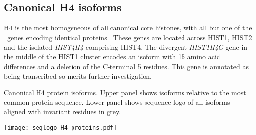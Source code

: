  \subsection{Canonical H4 isoforms}
    H4 is the most homogeneous of all canonical core histones,
    with all but one of the \HFourCodingGenes{}~genes encoding
    identical proteins .
    These genes are located across HIST1, HIST2 and the isolated
    \textit{HIST4H4} comprising HIST4.
    The divergent \textit{HIST1H4G} gene in the middle of the HIST1 cluster
    encodes an isoform with 15 amino acid differences and a deletion of the C-terminal 5 residues.
    This gene is annotated as being transcribed so merits further investigation.

    \begin{table}
      \caption{
        Canonical H4 protein isoforms.  Upper panel shows isoforms
        relative to the most common protein sequence.  Lower panel
        shows sequence logo of all isoforms aligned with invariant
        residues in grey.
      }
      \label{tab:H4-consensus}
      
      \texttt{[image: seqlogo\_H4\_proteins.pdf]}
    \end{table}

